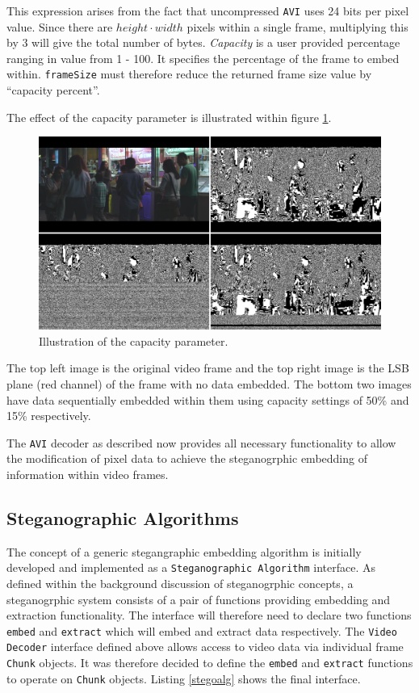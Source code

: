 \documentclass[paper=a4, fontsize=11pt,twoside]{scrartcl}
\numberwithin{table}{section}
\numberwithin{figure}{section}
\numberwithin{algorithm}{section}
\begin{document}
This expression arises from the fact that uncompressed \texttt{AVI} uses 24 bits per pixel value. Since there are $height \cdot width$ pixels within a single frame, multiplying this by 3 will give the total number of bytes. \textit{Capacity} is a user provided percentage ranging in value from 1 - 100. It specifies the percentage of the frame to embed within. \texttt{frameSize} must therefore reduce the returned frame size value by ``capacity percent''.

The effect of the capacity parameter is illustrated within figure \ref{cap50}. 

\begin{figure}[!h]
\centerline{\includegraphics[width=\textwidth]{images/cap_ill.png}}
\caption{Illustration of the capacity parameter.}
\label{cap50}
\end{figure}

\noindent
The top left image is the original video frame and the top right image is the LSB plane (red channel) of the frame with no data embedded. The bottom two images have data sequentially embedded within them using capacity settings of 50\% and 15\% respectively.


The \texttt{AVI} decoder as described now provides all necessary functionality to allow the modification of pixel data to achieve the steganogrphic embedding of information within video frames. 


\subsection{Steganographic Algorithms}

The concept of a generic stegangraphic embedding algorithm is initially developed and implemented as a \texttt{Steganographic Algorithm} interface. As defined within the background discussion of steganogrphic concepts, a steganogrphic system consists of a pair of functions providing embedding and extraction functionality. The interface will therefore need to declare two functions \texttt{embed} and \texttt{extract} which will embed and extract data respectively. The \texttt{Video Decoder} interface defined above allows access to video data via individual frame \texttt{Chunk} objects. It was therefore decided to define the \texttt{embed} and \texttt{extract} functions to operate on \texttt{Chunk} objects. Listing \ref{stegoalg} shows the final interface.
\end{document}
